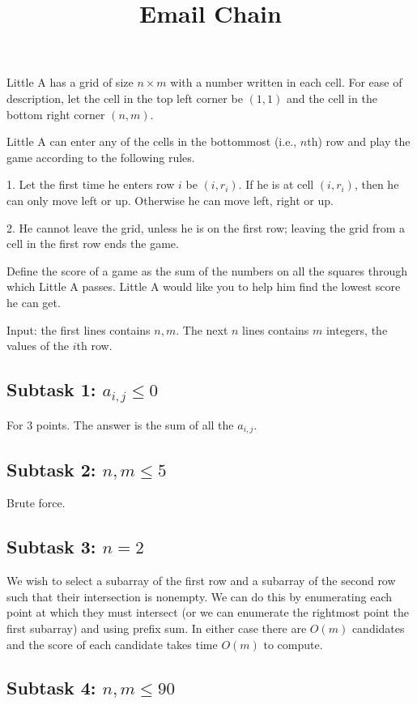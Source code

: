 \documentclass{article}
\title{Email Chain}
\date{}
\begin{document}
\maketitle

Little A has a grid of size $n \times m$ with a number written in each cell. For ease of description, let the cell in the top left corner be $(1,1)$ and the cell in the bottom right corner $(n,m)$.

Little A can enter any of the cells in the bottommost (i.e., $n$th) row and play the game according to the following rules.

1. Let the first time he enters row $i$ be $(i, r_i)$. If he is at cell $(i, r_i)$, then he can only move left or up. Otherwise he can move left, right or up.

2. He cannot leave the grid, unless he is on the first row; leaving the grid from a cell in the first row ends the game.

Define the score of a game as the sum of the numbers on all the squares through which Little A passes. Little A would like you to help him find the lowest score he can get.

Input: the first lines contains $n, m$. The next $n$ lines contains $m$ integers, the values of the $i$th row.


\subsection*{Subtask 1: $a_{i,j} \le 0$}

For 3 points. The answer is the sum of all the $a_{i,j}$.

\subsection*{Subtask 2: $n, m \le 5$}

Brute force.

\subsection*{Subtask 3: $n = 2$}

We wish to select a subarray of the first row and a subarray of the second row such that their intersection is nonempty. We can do this by enumerating each point at which they must intersect (or we can enumerate the rightmost point the first subarray) and using prefix sum. In either case there are $O(m)$ candidates and the score of each candidate takes time $O(m)$ to compute.

\subsection*{Subtask 4: $n, m \le 90$}
\end{document}
